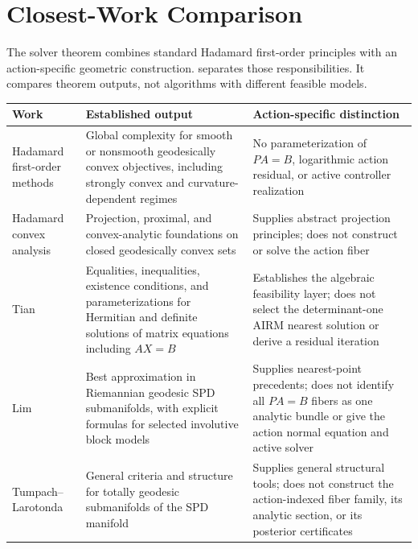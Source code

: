 \section{Closest-Work Comparison}
\label{app:closest-comparison}

The solver theorem combines standard Hadamard first-order principles with an
action-specific geometric construction.  
separates those responsibilities.  It compares theorem outputs, not algorithms
with different feasible models.

\begin{table}[ht]
\centering
\begingroup
\setlength{\tabcolsep}{5pt}
\footnotesize
\begin{tabular}{@{}p{}p{}p{}@{}}
\toprule
Work & Established output & Action-specific distinction \\
\midrule
Hadamard first-order methods \cite{zhang2016firstorder}
& Global complexity for smooth or nonsmooth geodesically convex objectives,
including strongly convex and curvature-dependent regimes
& No parameterization of \(PA=B\), logarithmic action residual, or active
controller realization \\

Hadamard convex analysis \cite{bacak2014convex}
& Projection, proximal, and convex-analytic foundations on closed geodesically
convex sets
& Supplies abstract projection principles; does not construct or solve the
action fiber \\

Tian \cite{tian2013hermitian}
& Equalities, inequalities, existence conditions, and parameterizations for
Hermitian and definite solutions of matrix equations including \(AX=B\)
& Establishes the algebraic feasibility layer; does not select the
determinant-one AIRM nearest solution or derive a residual iteration \\

Lim \cite{lim2004best}
& Best approximation in Riemannian geodesic SPD submanifolds, with explicit
formulas for selected involutive block models
& Supplies nearest-point precedents; does not identify all \(PA=B\) fibers as
one analytic bundle or give the action normal equation and active solver \\

Tumpach--Larotonda \cite{tumpach2024totally}
& General criteria and structure for totally geodesic submanifolds of the SPD
manifold
& Supplies general structural tools; does not construct the action-indexed
fiber family, its analytic section, or its posterior certificates \\


\end{tabular}
\end{table}
